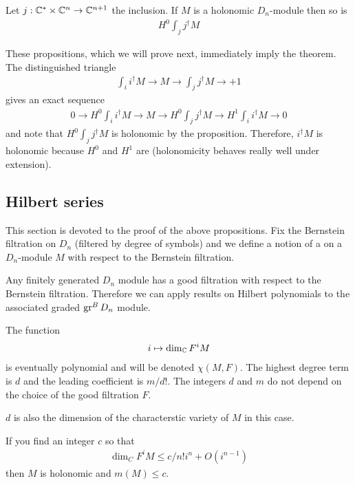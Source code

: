 \begin{proposition}\label{prop:holonomicity_pushforward}
	Let $j:\mathbb{C}^*\times\mathbb{C}^n\to\mathbb{C}^{n+1}$ the inclusion. If $M$ is a holonomic $D_n$-module then so is \begin{align*}
		H^0\int_j j^\dagger M
	\end{align*}
\end{proposition}
These propositions, which we will prove next, immediately imply the theorem. The distinguished triangle
\begin{align*}
	\int_i i^\dagger M \to M \to \int_j j^\dagger M \to +1
\end{align*} gives an exact sequence \begin{align*}
	0 \to H^0\int_i i^\dagger M \to M \to H^0\int_j j^\dagger M \to H^1\int_i i^\dagger M \to 0
\end{align*} and note that $H^0\int_j j^\dagger M$ is holonomic by the proposition. Therefore, $i^\dagger M$ is holonomic
because $H^0$ and $H^1$ are (holonomicity behaves really well under extension).

\subsection{Hilbert series}
This section is devoted to the proof of the above propositions.
Fix the Bernstein filtration on $D_n$ (filtered by degree of symbols) and we define a notion of a  on a $D_n$-module $M$ with
respect to the Bernstein filtration.

\hfill

Any finitely generated $D_n$ module has a good filtration with respect to the Bernstein filtration.
 Therefore we can apply results on Hilbert polynomials to the associated graded $\operatorname{gr}^B D_n$
module.

\begin{proposition}
	The function \begin{align*}
		i \mapsto \dim_{\mathbb{C}} F^iM
	\end{align*} is eventually polynomial and will be denoted $\chi(M,F)$.
	The highest degree term is $d$ and the leading coefficient is $m/d!$. The integers $d$ and $m$
	do not depend on the choice of the good filtration $F$.
\end{proposition}

$d$ is also the dimension of the characterstic variety of $M$ in this case.
\begin{proposition}
	If you find an integer $c$ so that \begin{align*}
		\dim_C F^iM \leq c/n! i^n + O(i^{n-1})
	\end{align*} then $M$ is holonomic and $m(M)\leq c$.
\end{proposition}

